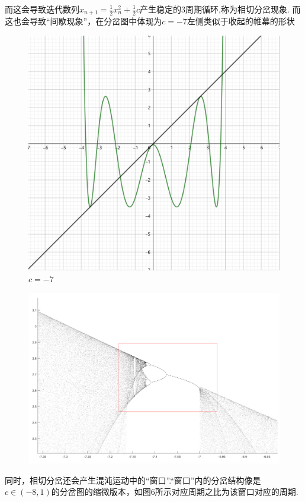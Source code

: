 \documentclass[a4paper]{article}%
\begin{document}
而这会导致迭代数列$x_{n+1}=\frac{1}{2}x_{n}^2+\frac{1}{2}c$产生稳定的3周期循环,称为相切分岔现象.
而这也会导致“间歇现象”，在分岔图中体现为$c=-7$左侧类似于收起的帷幕的形状\cite{c}
\begin{figure}[ht]
    \centering
    \includegraphics[scale=0.7]{图五}
    \caption[图五]{$c=-7$}\label{fig-图五}
    \end{figure}
\begin{figure}[H]
    \centering
    \includegraphics[scale=0.4]{图六}
    \caption[图六]{}\label{fig-图六}
    \end{figure}
同时，相切分岔还会产生混沌运动中的“窗口”.“窗口”内的分岔结构像是$c\in(-8,1)$的分岔图的缩微版本，如图6所示对应周期之比为该窗口对应的周期.
\end{document}
